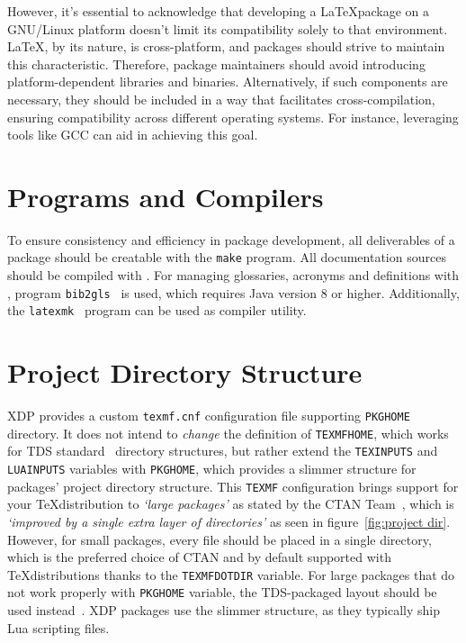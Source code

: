 \documentclass{xdpdoc}
\begin{document}
\begin{multicols}{2}
        However, it's essential to acknowledge that developing a \LaTeX package on a GNU/Linux platform doesn't limit its compatibility solely to that environment.
        \LaTeX, by its nature, is cross-platform, and packages should strive to maintain this characteristic.
        Therefore, package maintainers should avoid introducing platform-dependent libraries and binaries.
        Alternatively, if such components are necessary, they should be included in a way that facilitates cross-compilation, ensuring compatibility across different operating systems.
        For instance, leveraging tools like GCC can aid in achieving this goal.


        \section{Programs and Compilers}
        To ensure consistency and efficiency in package development, all deliverables of a package should be creatable with the \texttt{make} program.
        All documentation sources should be compiled with \LuaLaTeX.
        For managing glossaries, acronyms and definitions with \BibTeX, program \texttt{bib2gls}~\cite{bib2gls} is used, which requires Java version 8 or higher.
        Additionally, the \texttt{latexmk}~\cite{latexmk} program can be used as compiler utility.


        \section{Project Directory Structure}\label{sec:pds}

        XDP provides a custom \texttt{texmf.cnf} configuration file supporting \texttt{PKGHOME} directory.
        It does not intend to \textit{change} the definition of \texttt{TEXMFHOME}, which works for TDS standard~\cite{tds} directory structures, but rather extend the \texttt{TEXINPUTS} and \texttt{LUAINPUTS} variables with \texttt{PKGHOME}, which provides a slimmer structure for packages' project directory structure.
        This \texttt{TEXMF} configuration brings support for your \TeX distribution to \textit{`large packages'} as stated by the CTAN Team~\cite{ctan:help:upload}, which is \textit{`improved by a single extra layer of directories'} as seen in figure~\ref{fig:project dir}.
        However, for small packages, every file should be placed in a single directory, which is the preferred choice of CTAN and by default supported with \TeX distributions thanks to the \texttt{TEXMFDOTDIR} variable.
        For large packages that do not work properly with \texttt{PKGHOME} variable, the TDS-packaged layout should be used instead~\cite{ctan:help:tds}.
        XDP packages use the slimmer structure, as they typically ship Lua scripting files.


\end{multicols}
\end{document}
